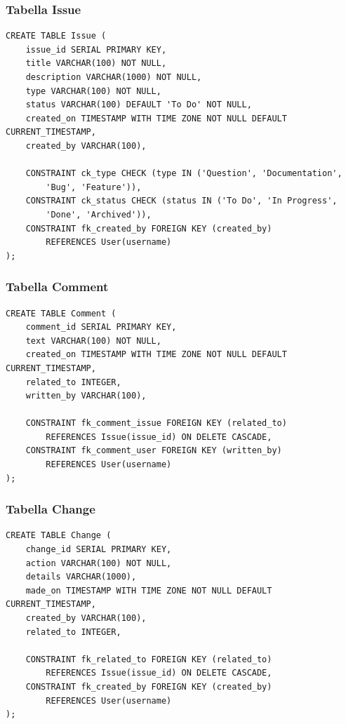 \subsubsection{Tabella Issue}
\noindent
\begin{minipage}{\linewidth}
\begin{lstlisting}[caption={Definizione della tabella Issue}]
CREATE TABLE Issue (
    issue_id SERIAL PRIMARY KEY,
    title VARCHAR(100) NOT NULL,
    description VARCHAR(1000) NOT NULL,
    type VARCHAR(100) NOT NULL,
    status VARCHAR(100) DEFAULT 'To Do' NOT NULL,
    created_on TIMESTAMP WITH TIME ZONE NOT NULL DEFAULT CURRENT_TIMESTAMP,
    created_by VARCHAR(100),
    
    CONSTRAINT ck_type CHECK (type IN ('Question', 'Documentation', 
        'Bug', 'Feature')),
    CONSTRAINT ck_status CHECK (status IN ('To Do', 'In Progress', 
        'Done', 'Archived')),
    CONSTRAINT fk_created_by FOREIGN KEY (created_by) 
        REFERENCES User(username)
);
\end{lstlisting}
\end{minipage}

\subsubsection{Tabella Comment}
\noindent
\begin{minipage}{\linewidth}
\begin{lstlisting}[caption={Definizione della tabella Comment}]
CREATE TABLE Comment (
    comment_id SERIAL PRIMARY KEY,
    text VARCHAR(100) NOT NULL,
    created_on TIMESTAMP WITH TIME ZONE NOT NULL DEFAULT CURRENT_TIMESTAMP,
    related_to INTEGER,
    written_by VARCHAR(100),

    CONSTRAINT fk_comment_issue FOREIGN KEY (related_to) 
        REFERENCES Issue(issue_id) ON DELETE CASCADE,
    CONSTRAINT fk_comment_user FOREIGN KEY (written_by) 
        REFERENCES User(username)
);
\end{lstlisting}
\end{minipage}

\subsubsection{Tabella Change}
\noindent
\begin{minipage}{\linewidth}
\begin{lstlisting}[caption={Definizione della tabella Change}]
CREATE TABLE Change (
    change_id SERIAL PRIMARY KEY,
    action VARCHAR(100) NOT NULL,
    details VARCHAR(1000),
    made_on TIMESTAMP WITH TIME ZONE NOT NULL DEFAULT CURRENT_TIMESTAMP,
    created_by VARCHAR(100),
    related_to INTEGER,

    CONSTRAINT fk_related_to FOREIGN KEY (related_to) 
        REFERENCES Issue(issue_id) ON DELETE CASCADE,
    CONSTRAINT fk_created_by FOREIGN KEY (created_by) 
        REFERENCES User(username)
);
\end{lstlisting}
\end{minipage}

